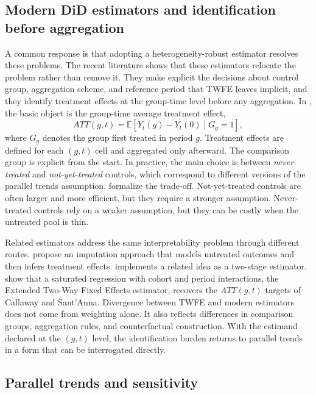 \subsection{Modern DiD estimators and identification before aggregation}

A common response is that adopting a heterogeneity-robust estimator resolves these problems. The recent literature shows that these estimators relocate the problem rather than remove it. They make explicit the decisions about control group, aggregation scheme, and reference period that TWFE leaves implicit, and they identify treatment effects at the group-time level before any aggregation. In \textcite{callaway2021difference}, the basic object is the group-time average treatment effect,
\begin{equation}
ATT(g,t)
=
\mathbb{E}\!\left[ Y_t(g)-Y_t(0)\mid G_g=1 \right],
\label{eq:att_gt_short}
\end{equation}
where \(G_g\) denotes the group first treated in period \(g\). Treatment effects are defined for each \((g,t)\) cell and aggregated only afterward. The comparison group is explicit from the start. In practice, the main choice is between \emph{never-treated} and \emph{not-yet-treated} controls, which correspond to different versions of the parallel trends assumption. \textcite{marcus2021role} formalize the trade-off. Not-yet-treated controls are often larger and more efficient, but they require a stronger assumption. Never-treated controls rely on a weaker assumption, but they can be costly when the untreated pool is thin.

Related estimators address the same interpretability problem through different routes. \textcite{borusyak2024revisiting} propose an imputation approach that models untreated outcomes and then infers treatment effects. \textcite{gardner2022two} implements a related idea as a two-stage estimator. \textcite{wooldridge2021two,wooldridge2025two} show that a saturated regression with cohort and period interactions, the Extended Two-Way Fixed Effects estimator, recovers the \(ATT(g,t)\) targets of Callaway and Sant'Anna. Divergence between TWFE and modern estimators does not come from weighting alone. It also reflects differences in comparison groups, aggregation rules, and counterfactual construction. With the estimand declared at the \((g,t)\) level, the identification burden returns to parallel trends in a form that can be interrogated directly.

\subsection{Parallel trends and sensitivity}

